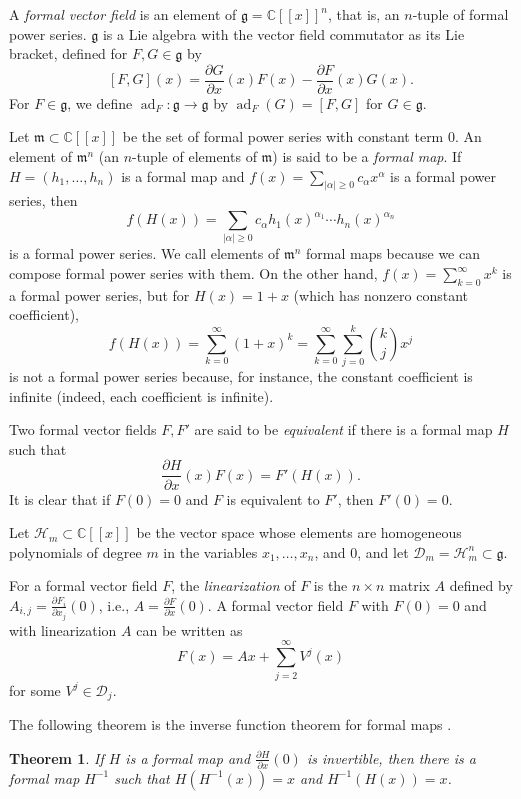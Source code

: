 \documentclass{article}
\newtheorem{theorem}{Theorem}
\newcommand{\ad}{\operatorname{ad}}
\begin{document}
A {\em formal vector field} is an element of $\mathfrak{g}=\mathbb{C}[[x]]^n$, that is, an $n$-tuple of formal power series.
$\mathfrak{g}$ is a Lie algebra with the vector field commutator as its Lie bracket, defined for $F,G \in \mathfrak{g}$ by
\[
[F,G](x)=\frac{\partial G}{\partial x}(x) F(x)-\frac{\partial F}{\partial x}(x) G(x).
\]
For $F \in \mathfrak{g}$, we define $\ad_F:\mathfrak{g} \to \mathfrak{g}$ by $\ad_F(G)=[F,G]$ for $G \in \mathfrak{g}$. 


Let $\mathfrak{m} \subset \mathbb{C}[[x]]$ be the set of formal power series with constant term $0$. 
An element of $\mathfrak{m}^n$ (an $n$-tuple of elements of $\mathfrak{m}$) is said to be a {\em formal map}. If $H=(h_1,\ldots,h_n)$ is a formal map and $f(x)=\sum_{|\alpha| \geq 0} c_\alpha x^\alpha$ is a formal power series, then
\[
f(H(x))=\sum_{|\alpha| \geq 0} c_\alpha h_1(x)^{\alpha_1} \cdots h_n(x)^{\alpha_n}
\] 
is a formal power series. We call elements of $\mathfrak{m}^n$ formal maps because we can compose
formal power series with them. On the other hand, $f(x)=\sum_{k=0}^\infty x^k$ is a formal power series, but 
for $H(x)=1+x$ (which has nonzero constant coefficient),
\[
f(H(x))=\sum_{k=0}^\infty (1+x)^k= \sum_{k=0}^\infty \sum_{j=0}^k \binom{k}{j} x^j
\]
is not a formal power series because, for instance, the constant coefficient is infinite (indeed, each coefficient is infinite).

Two formal vector fields $F,F'$ are said to be {\em equivalent} if there is a
formal map $H$ such that 
\[
\frac{\partial H}{\partial x}(x)F(x)=F'(H(x)).
\]
It is clear that if $F(0)=0$ and $F$ is equivalent to $F'$, then $F'(0)=0$.

Let $\mathscr{H}_m \subset \mathbb{C}[[x]]$ be the vector space whose elements are homogeneous polynomials of degree $m$ 
in the variables $x_1,\ldots,x_n$, and $0$, and let $\mathscr{D}_m=
\mathscr{H}_m^n \subset \mathfrak{g}$.

For a formal vector field $F$, the {\em linearization} of $F$ is the $n \times n$ matrix $A$ defined by $A_{i,j}=\frac{\partial F_i}{\partial x_j}(0)$, i.e., $A=\frac{\partial F}{\partial x}(0)$. A formal vector field
$F$ with $F(0)=0$ and with linearization $A$ can be written as 
\[
F(x)=Ax+\sum_{j=2}^\infty V^j(x)
\]
for some $V^j \in \mathscr{D}_j$.

The following theorem is the inverse function theorem for formal maps \cite[pp. 32--33]{analytic}.

\begin{theorem}
If $H$ is a formal map and $\frac{\partial H}{\partial x}(0)$ is invertible, then there is a formal map $H^{-1}$ such that $H(H^{-1}(x))=x$ and $H^{-1}(H(x))=x$.
\end{theorem}
\end{document}

